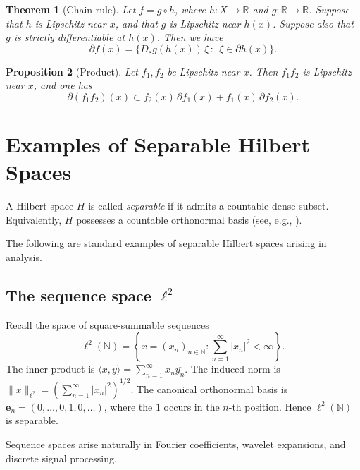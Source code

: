 \documentclass[12pt]{amsart}
\numberwithin{equation}{section}
\newtheorem{theorem}{Theorem}[section]
\newtheorem{proposition}[theorem]{Proposition}
\begin{document}
\begin{theorem}[Chain rule]\label{thm:Chain rule}
Let $f=g\circ h$, where $h: X \to \mathbb{R}$ and $g:\mathbb{R}\to \mathbb{R}$. Suppose that $h$ is Lipschitz near $x$, and that $g$ is Lipschitz near $h(x)$.  Suppose also that $g$ is strictly differentiable at $h(x)$. Then we have
\begin{equation*}
    \partial f(x) = 
    \{D_s g(h(x))\,\xi \,: \, \; \xi \in \partial h(x)\}.
\end{equation*}
\end{theorem}


\begin{proposition}[Product]\label{prop:product}
Let $f_1, f_2$ be Lipschitz near $x$. Then $f_{1}f_{2}$ is Lipschitz near $x$, and one has
\begin{equation*}
    \partial (f_{1}f_{2})(x) \subset f_{2}(x)\,\partial f_{1}(x) + f_{1}(x)\,\partial f_{2}(x).
\end{equation*}
\end{proposition}




\section{Examples of Separable Hilbert Spaces}\label{app:examples of H}

A Hilbert space $H$ is called \textit{separable} if it admits a countable dense subset. Equivalently, $H$ possesses a countable orthonormal basis (see, e.g.,  \cite[Problem 17]{halmos2012hilbert}).

The following are standard examples of separable Hilbert spaces arising in analysis.

\subsection{The sequence space \texorpdfstring{$\ell^2$}{l2}}

Recall the space of square-summable sequences 
\[
    \ell^2(\mathbb{N}) = \left\{ x=(x_n)_{n\in\mathbb{N}} : \sum_{n=1}^\infty |x_n|^2 < \infty \right\}.
\]
The inner product is $\langle x,y\rangle = \sum_{n=1}^\infty x_n \overline{y_n}$.  The induced norm is $\|x\|_{\ell^2} = \left( \sum_{n=1}^\infty |x_n|^2 \right)^{1/2}$. The canonical orthonormal basis is $\mathbf{e}_n=(0,\dots,0,1,0,\dots)$, where the $1$ occurs in the $n$-th position. Hence $\ell^2(\mathbb{N})$ is separable. 

Sequence spaces arise naturally in Fourier coefficients, wavelet expansions, and discrete signal processing.
\end{document}
